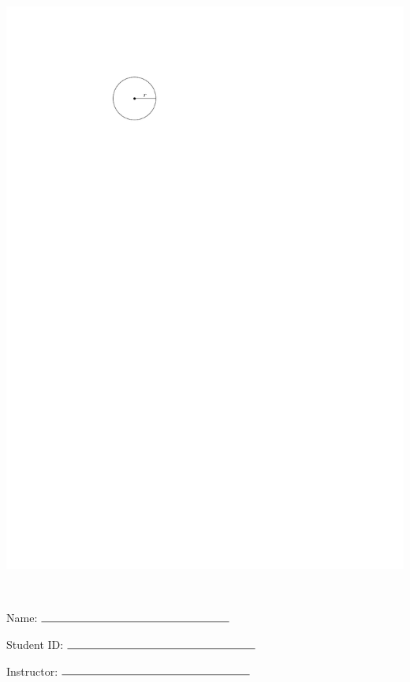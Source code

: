 \documentclass[12pt]{amsart}
\begin{document}
\begin{enumerate}
\includegraphics[scale = 0.8]{circle}

\vspace{1cm}
\newpage  $ $   \newpage\end{enumerate}\graphicspath{{C:/Users/iainc/anaconda3/Randomizer/Sample Course/Sample Assessment/}}\setcounter{page}{1}


\thispagestyle{fancy}

 
\noindent Name: $\rule{6cm}{0.15mm}$

\vspace{.2cm}

\noindent Student ID: $\rule{6cm}{0.15mm}$

\vspace{.2cm}

\noindent Instructor: $\rule{6cm}{0.15mm}$
\end{document}
